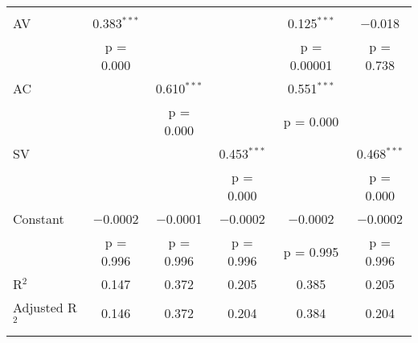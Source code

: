 
\begin{tabular}{@{\extracolsep{5pt}}lccccc} 
\\[-1.8ex]
\hline \\[-1.8ex] 
 AV & 0.383$^{***}$ &  &  & 0.125$^{***}$ & $-$0.018 \\ 
  & p = 0.000 &  &  & p = 0.00001 & p = 0.738 \\ 
 AC &  & 0.610$^{***}$ &  & 0.551$^{***}$ &  \\ 
  &  & p = 0.000 &  & p = 0.000 &  \\ 
 SV &  &  & 0.453$^{***}$ &  & 0.468$^{***}$ \\ 
  &  &  & p = 0.000 &  & p = 0.000 \\ 
 Constant & $-$0.0002 & $-$0.0001 & $-$0.0002 & $-$0.0002 & $-$0.0002 \\ 
  & p = 0.996 & p = 0.996 & p = 0.996 & p = 0.995 & p = 0.996 \\ 
R$^{2}$ & 0.147 & 0.372 & 0.205 & 0.385 & 0.205 \\ 
Adjusted R$^{2}$ & 0.146 & 0.372 & 0.204 & 0.384 & 0.204 \\ 
\hline \\[-1.8ex] 
\end{tabular} 
